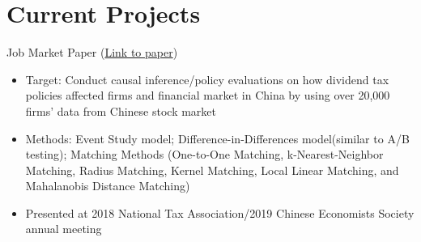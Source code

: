 \documentclass{resume}
\begin{document}
\section{Current Projects}
Job Market Paper (\href{https://liberalarts.tulane.edu/sites/liberalarts.tulane.edu/files/sites/default/files/Xie%20JMP_0.pdf}{Link to paper})
\begin{itemize}
  \item Target: Conduct causal inference/policy evaluations on how dividend tax policies affected firms and financial market in China by using over 20,000 firms' data from Chinese stock market 
  \item Methods: Event Study model; Difference-in-Differences model(similar to A/B testing); Matching Methods (One-to-One Matching, k-Nearest-Neighbor Matching, Radius Matching, Kernel Matching, Local Linear Matching, and Mahalanobis Distance Matching)
  \item Presented at 2018 National Tax Association/2019 Chinese Economists Society annual meeting
\end{itemize}
\end{document}
